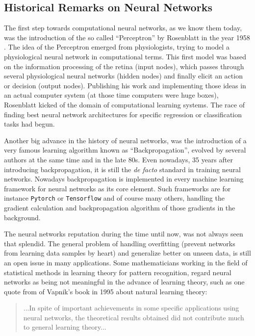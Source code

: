 
\subsection{Historical Remarks on Neural Networks}\label{sec:prev_nn_history}
The first step towards computational neural networks, as we know them today, was the introduction of the so called \enquote{Perceptron} by Rosenblatt in the year 1958 \cite{Rosenblatt1958}. 
The idea of the Perceptron emerged from physiologists, trying to model a physiological neural network in computational terms. 
This first model was based on the information processing of the retina (input nodes), which passes through several physiological neural networks (hidden nodes) and finally elicit an action or decision (output nodes).
Publishing his work and implementing those ideas in an actual computer system (at those time computers were huge boxes), Rosenblatt kicked of the domain of computational learning systems.
The race of finding best neural network architectures for specific regression or classification tasks had begun.

Another big advance in the history of neural networks, was the introduction of a very famous learning algorithm known as \enquote{Backpropagation}, evolved by several authors at the same time \cite{LeCun1986} and \cite{Rumelhart1986} in the late 80s. 
Even nowadays, 35 years after introducing backpropagation, it is still the \emph{de facto} standard in training neural networks.
Nowadays backpropagation is implemented in every machine learning framework for neural networks as its core element.
Such frameworks are for instance \texttt{Pytorch} or \texttt{Tensorflow} and of course many others, handling the gradient calculation and backpropagation algorithm of those gradients in the background.

The neural networks reputation during the time until now, was not always seen that splendid.
The general problem of handling overfitting (prevent networks from learning data samples by heart) and generalize better on unseen data, is still an open issue in many applications.
Some mathematicians working in the field of statistical methods in learning theory for pattern recognition, regard neural networks as being not meaningful in the advance of learning theory, such as one quote from \cite{Vapnik1995} of Vapnik's book in 1995 about natural learning theory:

\begin{quote}
...In spite of important achievements in some specific applications using neural networks, the theoretical results obtained did not contribute much to general learning theory...
\end{quote}

